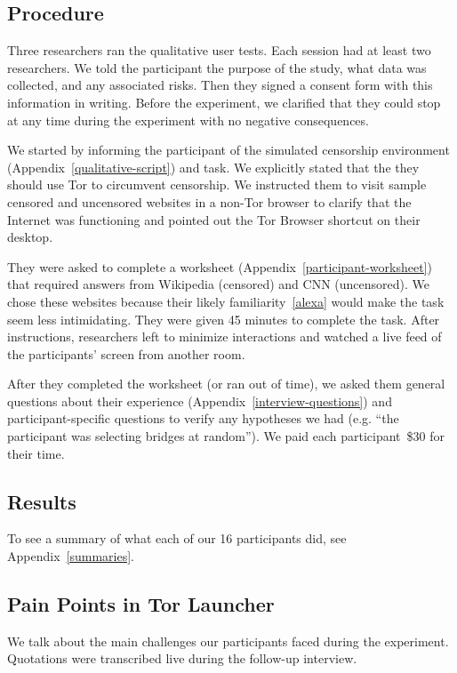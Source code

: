 \documentclass[USenglish,oneside,twocolumn]{article}
\begin{document}
\subsection{Procedure}
Three researchers ran the qualitative user tests. Each session had at least two researchers.  
We told the participant the purpose of the 
study, what data was collected, and any associated risks. 
Then they signed a consent form with this information in writing. 
Before the experiment, we clarified that they could stop at any time during the experiment with no negative consequences. 

We started by informing the participant of the simulated censorship environment (Appendix~\ref{qualitative-script}) and task. We explicitly stated that the they should use Tor to circumvent censorship. 
We instructed them to visit sample censored and uncensored websites
in a non-Tor browser to clarify that the Internet was functioning and
pointed out the Tor Browser shortcut on their desktop.

They were asked to complete a worksheet (Appendix~\ref{participant-worksheet}) that 
required answers from Wikipedia (censored) and CNN (uncensored).
We chose these websites because their likely familiarity~\ref{alexa}
would make the task seem less intimidating. They were given 45 minutes to complete the task. 
After instructions, researchers left to minimize interactions and watched a live feed of the participants' screen from another room.

After they completed the worksheet (or ran out of time),
we asked them general questions about their experience (Appendix~\ref{interview-questions}) and participant-specific questions to verify any hypotheses we had (e.g. ``the participant was selecting bridges at random''). We paid each participant~\$30 for their time. 

\subsection{Results} 

To see a summary of what each of our 16 participants did, see Appendix~\ref{summaries}. 

\subsection{Pain Points in Tor Launcher} 
\label{sec:pain-points}
We talk about the main challenges our participants faced during the experiment. 
Quotations were transcribed live during the follow-up interview.
\end{document}
